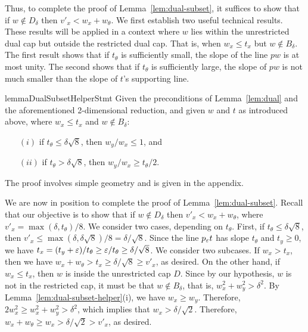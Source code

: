 \documentclass[11pt]{article}   \usepackage[letterpaper,hmargin=2.1cm,vmargin=3cm]{geometry}
\begin{document}
Thus, to complete the proof of Lemma~\ref{lem:dual-subset}, it suffices to show that if $w \notin D_{\delta}$ then $v'_x < w_x + w_{\theta}$. We first establish two useful technical results. These results will be applied in a context where $w$ lies within the unrestricted dual cap but outside the restricted dual cap. That is, when $w_x \le t_x$ but $w \notin B_{\delta}$. The first result shows that if $t_{\theta}$ is sufficiently small, the slope of the line $p w$ is at most unity. The second shows that if $t_{\theta}$ is sufficiently large, the slope of $p w$ is not much smaller than the slope of $t$'s supporting line.

\begin{restatable}{lemma}{DualSubsetHelperStmt}\label{lem:dual-subset-helper}
Given the preconditions of Lemma~\ref{lem:dual} and the aforementioned 2-dimensional reduction, and given $w$ and $t$ as introduced above, where $w_x \le t_x$ and $w \notin B_{\delta}$:
\begin{enumerate}
\item[$(i)$] if $t_{\theta} \le \delta\sqrt{8}$, then $w_y/w_x \le 1$, and

\item[$(ii)$] if $t_{\theta} > \delta\sqrt{8}$, then $w_y/w_x \ge t_{\theta}/2$.
\end{enumerate}
\end{restatable}


The proof involves simple geometry and is given in the appendix.

\medskip

We are now in position to complete the proof of Lemma~\ref{lem:dual-subset}. Recall that our objective is to show that if $w \notin D_{\delta}$ then $v'_x < w_x + w_{\theta}$, where $v'_x = \max(\delta, t_{\theta})/8$. We consider two cases, depending on $t_{\theta}$. First, if $t_{\theta} \le \delta\sqrt{8}$, then $v'_x \le \max(\delta, \delta\sqrt{8})/8 = \delta/\sqrt{8}$. Since the line $p_{\varepsilon} t$ has slope $t_{\theta}$ and $t_y \ge 0$, we have $t_x = (t_y + \varepsilon)/t_{\theta} \ge \varepsilon/t_{\theta} \ge \delta/\sqrt{8}$. We consider two subcases. If $w_x > t_x$, then we have $w_x + w_{\theta} > t_x \ge \delta/\sqrt{8} \ge v'_x$, as desired. On the other hand, if $w_x \le t_x$, then $w$ is inside the unrestricted cap $D$. Since by our hypothesis, $w$ is not in the restricted cap, it must be that $w \notin B_{\delta}$, that is, $w_x^2 + w_y^2 > \delta^2$. By Lemma~\ref{lem:dual-subset-helper}(i), we have $w_x \ge w_y$. Therefore, $2 w_x^2 \ge w_x^2 + w_y^2 > \delta^2$, which implies that $w_x > \delta/\sqrt{2}$. Therefore, $w_x + w_{\theta} \ge w_x > \delta/\sqrt{2} > v'_x$, as desired.
\end{document}
